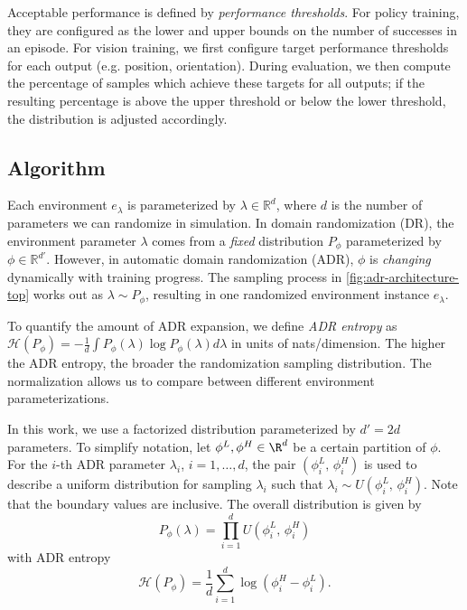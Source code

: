 Acceptable performance is defined by \emph{performance thresholds}. For policy training, they are configured as the lower and upper bounds on the number of successes in an episode. For vision training, we first configure target performance thresholds for each output (e.g. position, orientation). During evaluation, we then compute the percentage of samples which achieve these targets for all outputs; if the resulting percentage is above the upper threshold or below the lower threshold, the distribution is adjusted accordingly.

\subsection{Algorithm}\label{sec:adr_algorithm}






Each environment $e_\lambda$ is parameterized by $\lambda \in \mathbb{R}^d$, where $d$ is the number of parameters we can randomize in simulation. In domain randomization (DR), the environment parameter $\lambda$ comes from a \emph{fixed} distribution $P_\phi$ parameterized by $\phi \in \mathbb{R}^{d'}$. However, in automatic domain randomization (ADR), $\phi$ is \emph{changing} dynamically with training progress. The sampling process in \autoref{fig:adr-architecture-top} works out as $\lambda \sim P_\phi$, resulting in one randomized environment instance $e_\lambda$.

To quantify the amount of ADR expansion, we define \emph{ADR entropy} as $\mathcal{H}(P_\phi) = -\frac{1}{d}\int P_{\phi}(\lambda) \log P_{\phi}(\lambda) d\lambda$ 
in units of nats/dimension. The higher the ADR entropy, the broader the randomization sampling distribution. The normalization allows us to compare between different environment parameterizations.

In this work, we use a factorized distribution parameterized by $d' = 2d$ parameters. To simplify notation, let $\phi^L, \phi^H \in \R^d$ be a certain partition of $\phi$. For the $i$-th ADR parameter $\lambda_i$, $i = 1, \dots, d$, the pair $(\phi^L_i,\, \phi^H_i)$ is used to describe a uniform distribution for sampling $\lambda_i$ such that $\lambda_i \sim U(\phi^L_i,\, \phi^H_i)$. Note that the boundary values are inclusive. The overall  distribution is given by
\begin{equation*}
P_{\phi}(\lambda) = \prod_{i=1}^d U(\phi^L_i,\, \phi^H_i)
\end{equation*}
with ADR entropy
\begin{equation*}
\mathcal{H}(P_\phi) = \frac{1}{d}\sum_{i=1}^d \log(\phi^H_i - \phi^L_i).
\end{equation*}


